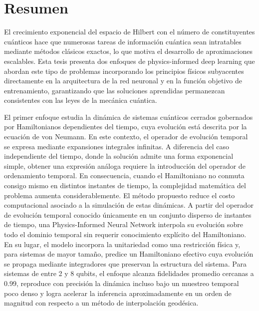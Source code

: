 \chapter*{Resumen}

El crecimiento exponencial del espacio de Hilbert con el número de constituyentes cuánticos hace que numerosas tareas de información cuántica sean intratables mediante métodos clásicos exactos, lo que motiva el desarrollo de aproximaciones escalables. Esta tesis presenta dos enfoques de physics-informed deep learning que abordan este tipo de problemas incorporando los principios físicos subyacentes directamente en la arquitectura de la red neuronal y en la función objetivo de entrenamiento, garantizando que las soluciones aprendidas permanezcan consistentes con las leyes de la mecánica cuántica.

El primer enfoque estudia la dinámica de sistemas cuánticos cerrados gobernados por Hamiltonianos dependientes del tiempo, cuya evolución está descrita por la ecuación de von Neumann. En este contexto, el operador de evolución temporal se expresa mediante expansiones integrales infinitas. A diferencia del caso independiente del tiempo, donde la solución admite una forma exponencial simple, obtener una expresión análoga requiere la introducción del operador de ordenamiento temporal. En consecuencia, cuando el Hamiltoniano no conmuta consigo mismo en distintos instantes de tiempo, la complejidad matemática del problema aumenta considerablemente. El método propuesto reduce el costo computacional asociado a la simulación de estas dinámicas. A partir del operador de evolución temporal conocido únicamente en un conjunto disperso de instantes de tiempo, una Physics-Informed Neural Network interpola su evolución sobre todo el dominio temporal sin requerir conocimiento explícito del Hamiltoniano. En su lugar, el modelo incorpora la unitariedad como una restricción física y, para sistemas de mayor tamaño, predice un Hamiltoniano efectivo cuya evolución se propaga mediante integradores que preservan la estructura del sistema. Para sistemas de entre 2 y 8 qubits, el enfoque alcanza fidelidades promedio cercanas a 0.99, reproduce con precisión la dinámica incluso bajo un muestreo temporal poco denso y logra acelerar la inferencia aproximadamente en un orden de magnitud con respecto a un método de interpolación geodésica.

